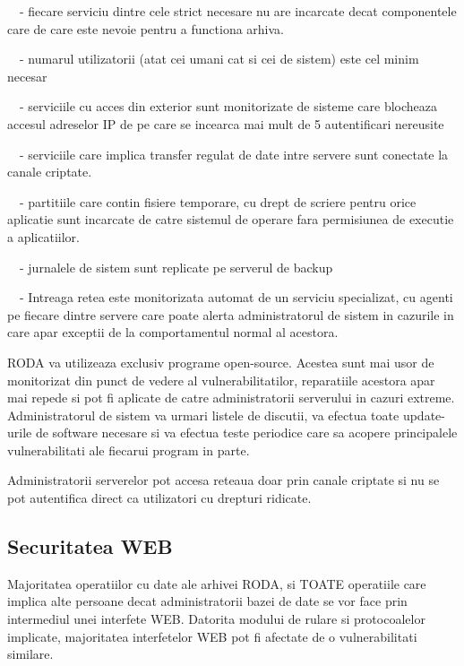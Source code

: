 {\sffamily\color{black}
\ \ {}- fiecare serviciu dintre cele strict necesare nu are incarcate decat componentele care de care este nevoie pentru
a functiona arhiva.}

{\sffamily\color{black}
\ \ {}- numarul utilizatorii (atat cei umani cat si cei de sistem) este cel minim necesar}

{\sffamily\color{black}
\ \ {}- serviciile cu acces din exterior sunt monitorizate de sisteme care blocheaza accesul adreselor IP de pe care se
incearca mai mult de 5 autentificari nereusite}

{\sffamily\color{black}
\ \ {}- serviciile care implica transfer regulat de date intre servere sunt conectate la canale criptate.}

{\sffamily\color{black}
\ \ {}- partitiile care contin fisiere temporare, cu drept de scriere pentru orice aplicatie sunt incarcate de catre
sistemul de operare fara permisiunea de executie a aplicatiilor. }

{\sffamily\color{black}
\ \ {}- jurnalele de sistem sunt replicate pe serverul de backup}

{\sffamily\color{black}
\ \ {}- Intreaga retea este monitorizata automat de un serviciu specializat, cu agenti pe fiecare dintre servere care
poate alerta administratorul de sistem in cazurile in care apar exceptii de la comportamentul normal al acestora. }

RODA va utilizeaza exclusiv programe open-source. Acestea sunt mai usor de monitorizat din punct de vedere al
vulnerabilitatilor, reparatiile acestora apar mai repede si pot fi aplicate de catre administratorii serverului in
cazuri extreme. Administratorul de sistem va urmari listele de discutii, va efectua toate update-urile de software
necesare si va efectua teste periodice care sa acopere principalele vulnerabilitati ale fiecarui program in parte.

Administratorii serverelor pot accesa reteaua doar prin canale criptate si nu se pot autentifica direct ca utilizatori
cu drepturi ridicate.

\subsection{Securitatea WEB}

Majoritatea operatiilor cu date ale arhivei RODA, si TOATE operatiile care implica alte persoane decat administratorii
bazei de date se vor face prin intermediul unei interfete WEB. Datorita modului de rulare si protocoalelor implicate,
majoritatea interfetelor WEB pot fi afectate de o vulnerabilitati similare. 

